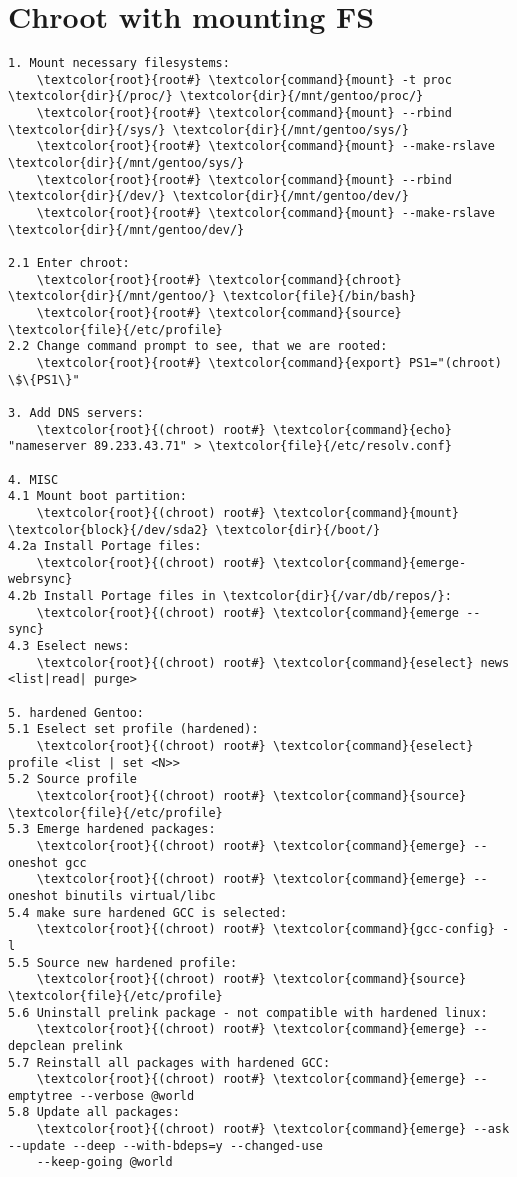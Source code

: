 \documentclass[10pt, a4paper, onecolumn, openany]{book}         %
\begin{document}
\section{Chroot with mounting FS}
\begin{Verbatim}[commandchars=\\\{\}]
1. Mount necessary filesystems:
    \textcolor{root}{root#} \textcolor{command}{mount} -t proc \textcolor{dir}{/proc/} \textcolor{dir}{/mnt/gentoo/proc/}
    \textcolor{root}{root#} \textcolor{command}{mount} --rbind \textcolor{dir}{/sys/} \textcolor{dir}{/mnt/gentoo/sys/}
    \textcolor{root}{root#} \textcolor{command}{mount} --make-rslave \textcolor{dir}{/mnt/gentoo/sys/}
    \textcolor{root}{root#} \textcolor{command}{mount} --rbind \textcolor{dir}{/dev/} \textcolor{dir}{/mnt/gentoo/dev/}
    \textcolor{root}{root#} \textcolor{command}{mount} --make-rslave \textcolor{dir}{/mnt/gentoo/dev/}

2.1 Enter chroot:
    \textcolor{root}{root#} \textcolor{command}{chroot} \textcolor{dir}{/mnt/gentoo/} \textcolor{file}{/bin/bash}
    \textcolor{root}{root#} \textcolor{command}{source} \textcolor{file}{/etc/profile}
2.2 Change command prompt to see, that we are rooted:
    \textcolor{root}{root#} \textcolor{command}{export} PS1="(chroot) \$\{PS1\}"

3. Add DNS servers:
    \textcolor{root}{(chroot) root#} \textcolor{command}{echo} "nameserver 89.233.43.71" > \textcolor{file}{/etc/resolv.conf}

4. MISC
4.1 Mount boot partition:
    \textcolor{root}{(chroot) root#} \textcolor{command}{mount} \textcolor{block}{/dev/sda2} \textcolor{dir}{/boot/}
4.2a Install Portage files:
    \textcolor{root}{(chroot) root#} \textcolor{command}{emerge-webrsync}
4.2b Install Portage files in \textcolor{dir}{/var/db/repos/}:
    \textcolor{root}{(chroot) root#} \textcolor{command}{emerge --sync}
4.3 Eselect news:
    \textcolor{root}{(chroot) root#} \textcolor{command}{eselect} news <list|read| purge>

5. hardened Gentoo:
5.1 Eselect set profile (hardened):
    \textcolor{root}{(chroot) root#} \textcolor{command}{eselect} profile <list | set <N>>
5.2 Source profile
    \textcolor{root}{(chroot) root#} \textcolor{command}{source} \textcolor{file}{/etc/profile}
5.3 Emerge hardened packages:
    \textcolor{root}{(chroot) root#} \textcolor{command}{emerge} --oneshot gcc
    \textcolor{root}{(chroot) root#} \textcolor{command}{emerge} --oneshot binutils virtual/libc
5.4 make sure hardened GCC is selected:
    \textcolor{root}{(chroot) root#} \textcolor{command}{gcc-config} -l
5.5 Source new hardened profile:
    \textcolor{root}{(chroot) root#} \textcolor{command}{source} \textcolor{file}{/etc/profile}
5.6 Uninstall prelink package - not compatible with hardened linux:
    \textcolor{root}{(chroot) root#} \textcolor{command}{emerge} --depclean prelink
5.7 Reinstall all packages with hardened GCC:
    \textcolor{root}{(chroot) root#} \textcolor{command}{emerge} --emptytree --verbose @world
5.8 Update all packages:
    \textcolor{root}{(chroot) root#} \textcolor{command}{emerge} --ask --update --deep --with-bdeps=y --changed-use 
    --keep-going @world



\end{Verbatim}
\end{document}
